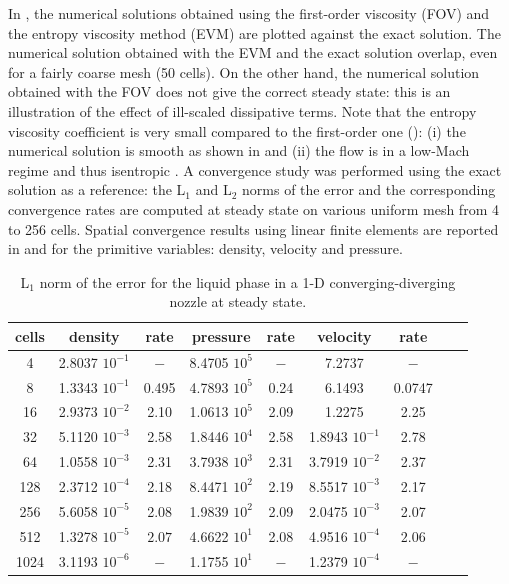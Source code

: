 %
In , the numerical solutions obtained using the first-order viscosity (FOV) and the entropy viscosity method (EVM) are plotted against the exact solution. The numerical solution obtained with the EVM and the exact solution overlap, even for a fairly coarse mesh (50 cells).
On the other hand, the numerical solution obtained with the FOV does not give the correct steady state: this is an illustration of the effect of ill-scaled dissipative terms. 
%
Note that the entropy viscosity coefficient is very small compared to the first-order one (): (i) the numerical solution is smooth as shown in  and (ii) the flow is in a low-Mach regime and thus isentropic . A convergence study was performed using the exact solution as a reference: the L$_1$ and L$_2$ norms of the error and the corresponding convergence rates are computed at steady state on various uniform mesh from 4 to 256 cells.
Spatial convergence results using linear finite elements are reported in  and  for the primitive variables: density, velocity and pressure.
%
\begin{table}[H]
\begin{center}
 \caption{\label{tbl:l1_norm_liq} L$_1$ norm of the error for the liquid phase in a 1-D converging-diverging nozzle at steady state.}
 \begin{tabular}{|c|c|c|c|c|c|c|c|c|}
 \hline
cells & density         & rate   & pressure        & rate    & velocity         & rate     \\ \hline
4    & 2.8037 $10^{-1}$ & $-$    & 8.4705 $10^{5}$ & $-$     & 7.2737           & $-$      \\ \hline
8    & 1.3343 $10^{-1}$ & 0.495 & 4.7893 $10^{5}$ & 0.24 & 6.1493           & 0.0747 \\ \hline
16   & 2.9373 $10^{-2}$ & 2.10 & 1.0613 $10^{5}$ & 2.09  & 1.2275           & 2.25   \\ \hline
32   & 5.1120 $10^{-3}$ & 2.58 & 1.8446 $10^{4}$ & 2.58  & 1.8943 $10^{-1}$ & 2.78   \\ \hline
64   & 1.0558 $10^{-3}$ & 2.31 & 3.7938 $10^{3}$ & 2.31  & 3.7919 $10^{-2}$ & 2.37   \\ \hline
128  & 2.3712 $10^{-4}$ & 2.18 & 8.4471 $10^{2}$ & 2.19  & 8.5517 $10^{-3}$ & 2.17   \\ \hline
256  & 5.6058 $10^{-5}$ & 2.08 & 1.9839 $10^{2}$ & 2.09  & 2.0475 $10^{-3}$ & 2.07   \\ \hline
512  & 1.3278 $10^{-5}$ & $2.07$ & 4.6622 $10^{1}$ & 2.08  & 4.9516 $10^{-4}$ & $2.06$   \\ \hline
1024  & 3.1193 $10^{-6}$ & $-$ & 1.1755 $10^{1}$ & $-$  & 1.2379 $10^{-4}$ & $-$   \\ \hline
\end{tabular}
\end{center}
\end{table}
